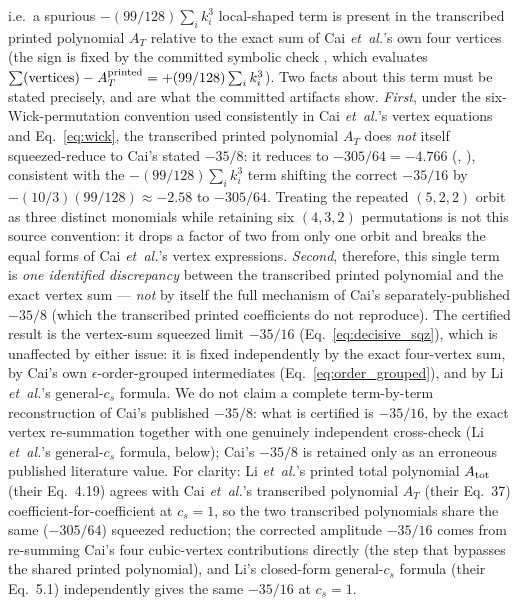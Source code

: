 \documentclass[aps,prd,twocolumn,superscriptaddress,showpacs,preprintnumbers,nofootinbib,longbibliography,floatfix]{revtex4-2}
\newcommand{\etal}{\textit{et~al.}}
\begin{document}
i.e.\ a spurious $-(99/128)\sum_i k_i^3$ local-shaped term is present in the transcribed printed polynomial $A_T$ relative to the exact sum of Cai \etal's own four vertices (the sign is fixed by the committed symbolic check , which evaluates $\sum(\text{vertices})-A_T^{\rm printed}=+(99/128)\sum_i k_i^3$). Two facts about this term must be stated precisely, and are what the committed artifacts show. \emph{First}, under the six-Wick-permutation convention used consistently in Cai \etal's vertex equations and Eq.~\eqref{eq:wick}, the transcribed printed polynomial $A_T$ does \emph{not} itself squeezed-reduce to Cai's stated $-35/8$: it reduces to $-305/64=-4.766$ (, ), consistent with the $-(99/128)\sum_i k_i^3$ term shifting the correct $-35/16$ by $-(10/3)(99/128)\approx-2.58$ to $-305/64$. Treating the repeated $(5,2,2)$ orbit as three distinct monomials while retaining six $(4,3,2)$ permutations is not this source convention: it drops a factor of two from only one orbit and breaks the equal forms of Cai \etal's vertex expressions. \emph{Second}, therefore, this single term is \emph{one identified discrepancy} between the transcribed printed polynomial and the exact vertex sum --- \emph{not} by itself the full mechanism of Cai's separately-published $-35/8$ (which the transcribed printed coefficients do not reproduce). The certified result is the vertex-sum squeezed limit $-35/16$ (Eq.~\ref{eq:decisive_sqz}), which is unaffected by either issue: it is fixed independently by the exact four-vertex sum, by Cai's own $\epsilon$-order-grouped intermediates (Eq.~\ref{eq:order_grouped}), and by Li \etal's general-$c_s$ formula. We do not claim a complete term-by-term reconstruction of Cai's published $-35/8$: what is certified is $-35/16$, by the exact vertex re-summation together with one genuinely independent cross-check (Li \etal's general-$c_s$ formula, below); Cai's $-35/8$ is retained only as an erroneous published literature value. For clarity: Li \etal's printed total polynomial $A_{\rm tot}$ (their Eq.~4.19) agrees with Cai \etal's transcribed polynomial $A_T$ (their Eq.~37) coefficient-for-coefficient at $c_s=1$, so the two transcribed polynomials share the same ($-305/64$) squeezed reduction; the corrected amplitude $-35/16$ comes from re-summing Cai's four cubic-vertex contributions directly (the step that bypasses the shared printed polynomial), and Li's closed-form general-$c_s$ formula (their Eq.~5.1) independently gives the same $-35/16$ at $c_s=1$.
\end{document}
